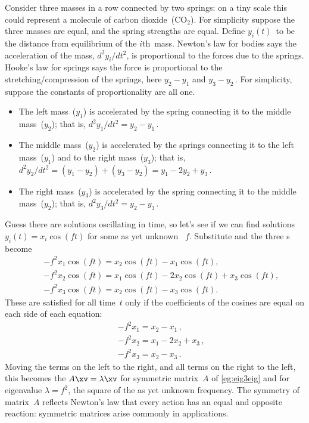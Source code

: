 \begin{reduce}
\begin{example} \label{eg:eig3vib}
Consider three masses in a row connected by two springs: on a tiny scale this could represent a molecule of carbon dioxide~(\(\text{CO}_2\)).
For simplicity suppose the three masses are equal, and the spring strengths are equal.
Define \(y_i(t)\)~to be the distance from equilibrium of the \(i\)th~mass.
Newton's law for bodies says the acceleration of the mass, \(d^2y_i/dt^2\), is proportional to the forces due to the springs.
Hooke's law for springs says the force is proportional to the stretching\slash compression of the springs, here \(y_2-y_1\) and \(y_3-y_2\)\,.
For simplicity, suppose the constants of proportionality are all one.
\begin{itemize}
\item The left mass~(\(y_1\)) is accelerated by the spring connecting it to the middle mass~(\(y_2\)); that is, \(d^2y_1/dt^2=y_2-y_1\)\,.
\item The middle mass~(\(y_2\)) is accelerated by the springs connecting it to the left mass~(\(y_1\)) and to the right mass~(\(y_3\)); that is, \(d^2y_2/dt^2=(y_1-y_2)+(y_3-y_2)=y_1-2y_2+y_3\)\,.
\item The right mass~(\(y_3\)) is accelerated by the spring connecting it to the middle mass~(\(y_2\)); that is, \(d^2y_3/dt^2=y_2-y_3\)\,.
\end{itemize}
Guess there are solutions oscillating in time, so let's see if we can find solutions \(y_i(t)=x_i\cos(ft)\) for some as yet unknown ~\(f\).
Substitute and the three s become
\begin{eqnarray*}
&&-f^2x_1\cos(ft)=x_2\cos(ft)-x_1\cos(ft),
\\&&-f^2x_2\cos(ft)=x_1\cos(ft)-2x_2\cos(ft)+x_3\cos(ft),
\\&&-f^2x_3\cos(ft)=x_2\cos(ft)-x_3\cos(ft).
\end{eqnarray*}
These are satisfied for all time~\(t\) only if the coefficients of the cosines are equal on each side of each equation:
\begin{eqnarray*}
&&-f^2x_1=x_2-x_1\,,
\\&&-f^2x_2=x_1-2x_2+x_3\,,
\\&&-f^2x_3=x_2-x_3\,.
\end{eqnarray*}
Moving the terms on the left to the right, and all terms on the right to the left, this becomes the  \(A\xv=\lambda\xv\) for symmetric matrix~\(A\) of \cref{eg:eig3eig} and for eigenvalue \(\lambda=f^2\), the square of the as yet unknown frequency.
The symmetry of matrix~\(A\) reflects Newton's law that every action has an equal and opposite reaction: symmetric matrices arise commonly in applications.


\end{example}
\end{reduce}
